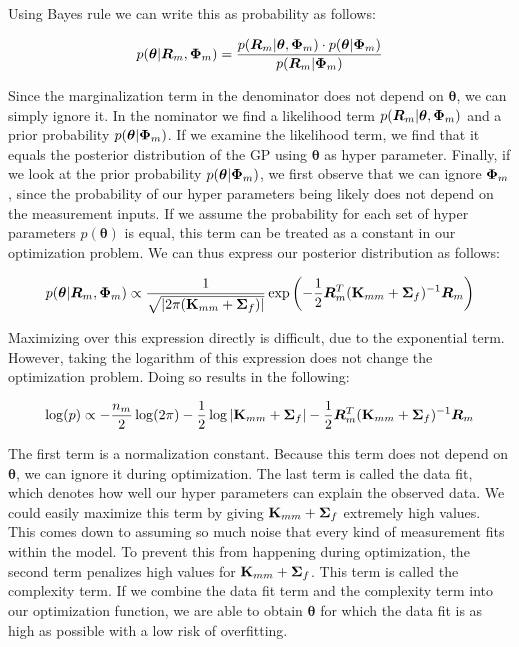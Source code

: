 \documentclass[mscThesis.tex]{subfiles}
\begin{document}
Using Bayes rule we can write this as probability as follows:

\begin{equation}
p(\bm{\theta} | \bm{R}_m, \mathbf{\Phi}_m) = \frac{p(\bm{R}_m | \bm{\theta}, \mathbf{\Phi}_m) \cdot p(\bm{\theta} | \mathbf{\Phi}_m)}{p(\bm{R}_m | \mathbf{\Phi}_m)}
\end{equation}

Since the marginalization term in the denominator does not depend on $\bm{\theta}$, we can simply ignore it. In the nominator we find a likelihood term $p(\bm{R}_m | \bm{\theta}, \mathbf{\Phi}_m)$ and a prior probability $p(\bm{\theta} | \mathbf{\Phi}_m)$. If we examine the likelihood term, we find that it equals the posterior distribution of the GP using $\bm{\theta}$ as hyper parameter. Finally, if we look at the prior probability $p(\bm{\theta} | \mathbf{\Phi}_m)$, we first observe that we can ignore $\mathbf{\Phi}_m$, since the probability of our hyper parameters being likely does not depend on the measurement inputs. If we assume the probability for each set of hyper parameters $p(\bm{\theta})$ is equal, this term can be treated as a constant in our optimization problem. We can thus express our posterior distribution as follows:

\begin{equation*}
p(\bm{\theta} | \bm{R}_m, \mathbf{\Phi}_m) \propto \frac{1}{\sqrt{ |2 \pi (\mathbf{K}_{mm}+\mathbf{\Sigma}_f) | }} \exp \left( -\frac{1}{2} \bm{R}_m^T (\mathbf{K}_{mm}+\mathbf{\Sigma}_f)^{-1} \bm{R}_m \right)
\end{equation*}

Maximizing over this expression directly is difficult, due to the exponential term. However, taking the logarithm of this expression does not change the optimization problem. Doing so results in the following:

\begin{equation}
\log (p) \propto -\frac{n_m}{2} \log (2 \pi) -\frac{1}{2} \log | \mathbf{K}_{mm} + \mathbf{\Sigma}_f | -\frac{1}{2} \bm{R}_m^T (\mathbf{K}_{mm}+\mathbf{\Sigma}_f)^{-1} \bm{R}_m
\end{equation}

The first term is a normalization constant. Because this term does not depend on $\bm{\theta}$, we can ignore it during optimization. The last term is called the data fit, which denotes how well our hyper parameters can explain the observed data. We could easily maximize this term by giving $\mathbf{K}_{mm}+\mathbf{\Sigma}_f$ extremely high values. This comes down to assuming so much noise that every kind of measurement fits within the model. To prevent this from happening during optimization, the second term penalizes high values for $\mathbf{K}_{mm}+\mathbf{\Sigma}_f$. This term is called the complexity term. If we combine the data fit term and the complexity term into our optimization function, we are able to obtain $\bm{\theta}$ for which the data fit is as high as possible with a low risk of overfitting.
\end{document}
